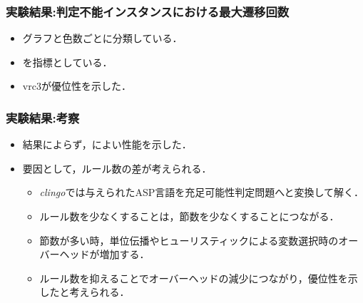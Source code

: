 \begin{frame}\frametitle{実験結果:判定不能インスタンスにおける最大遷移回数}
  
  \begin{table}[t]
    \centering
    
  \end{table}

  \begin{itemize}
    \item グラフと色数ごとに分類している．
    \item {}を指標としている．
    \item vrc3が優位性を示した．
  \end{itemize}

\end{frame}


\begin{frame}\frametitle{実験結果:考察}

  \begin{itemize}
    \item 結果によらず，によい性能を示した．
    \item 要因として，\alert{ルール数の差}が考えられる．
    \begin{itemize}
      \item \textit{clingo}では与えられたASP言語を充足可能性判定問題へと変換して解く．
      \item ルール数を少なくすることは，節数を少なくすることにつながる．
      \item 節数が多い時，単位伝播やヒューリスティックによる変数選択時のオーバーヘッドが増加する．
      \item ルール数を抑えることでオーバーヘッドの減少につながり，優位性を示したと考えられる．
    \end{itemize}
  \end{itemize}
  
\end{frame}


